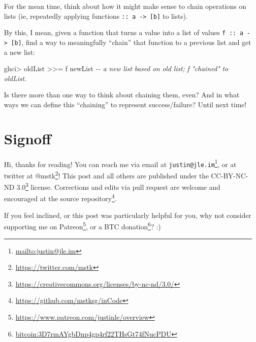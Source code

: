 \documentclass[]{article}
\newenvironment{Shaded}{}{}
\newcommand{\CommentTok}[1]{\textcolor[rgb]{0.38,0.63,0.69}{\textit{#1}}}
\newcommand{\NormalTok}[1]{#1}
\newcommand{\OperatorTok}[1]{\textcolor[rgb]{0.40,0.40,0.40}{#1}}
\renewcommand{\href}[2]{#2\footnote{\url{#1}}}
\begin{document}
For the mean time, think about how it might make sense to chain operations on
lists (ie, repeatedly applying functions
\texttt{::\ a\ -\textgreater{}\ {[}b{]}} to lists).

By this, I mean, given a function that turns a value into a list of values
\texttt{f\ ::\ a\ -\textgreater{}\ {[}b{]}}, find a way to meaningfully
``chain'' that function to a previous list and get a new list:

\begin{Shaded}
\begin{Highlighting}[]
\NormalTok{ghci}\OperatorTok{\textgreater{}}\NormalTok{ oldList }\OperatorTok{\textgreater{}\textgreater{}=}\NormalTok{ f}
\NormalTok{newList             }\CommentTok{{-}{-} a new list based on old list; f "chained" to \textasciigrave{}oldList\textasciigrave{}.}
\end{Highlighting}
\end{Shaded}

Is there more than one way to think about chaining them, even? And in what ways
we can define this ``chaining'' to represent success/failure? Until next time!

\section{Signoff}\label{signoff}

Hi, thanks for reading! You can reach me via email at
\href{mailto:justin@jle.im}{\nolinkurl{justin@jle.im}}, or at twitter at
\href{https://twitter.com/mstk}{@mstk}! This post and all others are published
under the \href{https://creativecommons.org/licenses/by-nc-nd/3.0/}{CC-BY-NC-ND
3.0} license. Corrections and edits via pull request are welcome and encouraged
at \href{https://github.com/mstksg/inCode}{the source repository}.

If you feel inclined, or this post was particularly helpful for you, why not
consider \href{https://www.patreon.com/justinle/overview}{supporting me on
Patreon}, or a \href{bitcoin:3D7rmAYgbDnp4gp4rf22THsGt74fNucPDU}{BTC donation}?
:)
\end{document}
